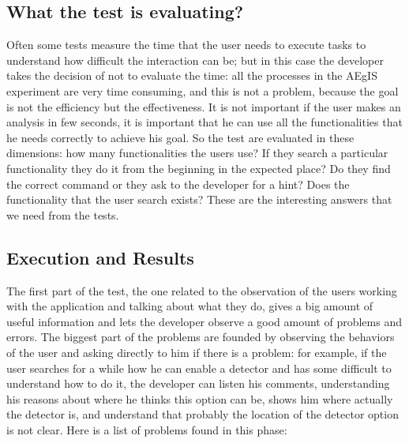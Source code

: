\subsection{What the test is evaluating?}
Often some tests measure the time that the user needs to execute tasks to understand how difficult the interaction can be; but in this case the developer takes the decision of not to evaluate the time: all the processes in the AEgIS experiment are very time consuming, and this is not a problem, because the goal is not the efficiency but the effectiveness. It is not important if the user makes an analysis in few seconds, it is important that he can use all the functionalities that he needs correctly to achieve his goal. So the test are evaluated in these dimensions: how many functionalities the users use? If they search a particular functionality they do it from the beginning in the expected place? Do they find the correct command or they ask to the developer for a hint? Does the functionality that the user search exists? These are the interesting answers that we need from the tests.  

\subsection{Execution and Results}
The first part of the test, the one related to the observation of the users working with the application and talking about what they do, gives a big amount of useful information and lets the developer observe a good amount of problems and errors. 
The biggest part of the problems are founded by observing the behaviors of the user and asking directly to him if there is a problem: for example, if the user searches for a while how he can enable a detector and has some difficult to understand how to do it, the developer can listen his comments, understanding his reasons about where he thinks this option can be, shows him where actually the detector is, and understand that probably the location of the detector option is not clear. 
Here is a list of problems found in this phase:


